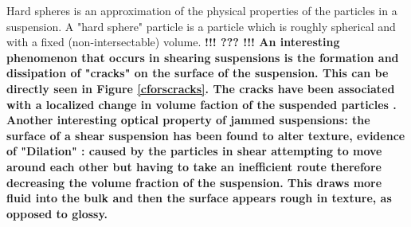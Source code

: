 \documentclass[twoside,a4]{report}
\def\br{\newline \newline \noindent}
\def\cbh{\large\bfseries !!! ??? !!! \normalsize\normalfont}
\begin{document}
	Hard spheres is an approximation of the physical properties of the particles in a suspension. A "hard sphere" particle is a particle which is roughly spherical and with a fixed (non-intersectable) volume. \cbh \br
	An interesting phenomenon that occurs in shearing suspensions is the formation and dissipation of "cracks" on the surface of the suspension. This can be directly seen in Figure \ref{cforscracks}. The cracks have been associated with a localized change in volume faction of the suspended particles \cite{backhawjam}. Another interesting optical property of jammed suspensions: the surface of a shear suspension has been found to alter texture, evidence of "Dilation" \cite{backbrownjaegrev}: caused by the particles in shear attempting to move around each other but having to take an inefficient route therefore decreasing the volume fraction of the suspension. This draws more fluid into the bulk and then the surface appears rough in texture, as opposed to glossy. 
	\newline \newline \noindent
\end{document}
